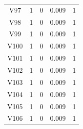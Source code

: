 \documentclass[a4paper, 12pt, openright, oneside, german, french, english, brazil]{abntex2}
\begin{document}
\begin{SingleSpace}
\begin{footnotesize}
\begin{center}
\begin{longtable}{c c c c c}
					V97 & 1 & 0 & 0.009 & 1 \\ 
					V98 & 1 & 0 & 0.009 & 1 \\ 
					V99 & 1 & 0 & 0.009 & 1 \\ 
					V100 & 1 & 0 & 0.009 & 1 \\ 
					V101 & 1 & 0 & 0.009 & 1 \\ 
					V102 & 1 & 0 & 0.009 & 1 \\ 
					V103 & 1 & 0 & 0.009 & 1 \\ 
					V104 & 1 & 0 & 0.009 & 1 \\ 
					V105 & 1 & 0 & 0.009 & 1 \\ 
					V106 & 1 & 0 & 0.009 & 1 \\
					
				\end{longtable}
			\end{center}
		\end{footnotesize}
	\end{SingleSpace}
	
\end{document}
